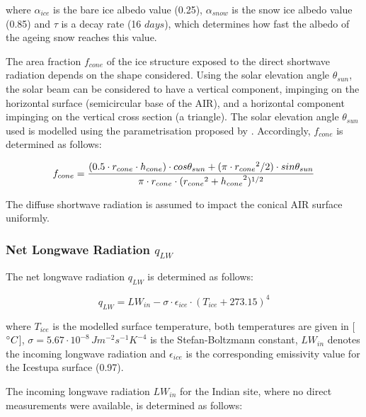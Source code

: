 \documentclass[utf8]{frontiersSCNS} %
\begin{document}
where $\alpha_{ice}$ is the bare ice albedo value (0.25), $\alpha_{snow}$ is the snow ice albedo value (0.85)
and $\tau$ is a decay rate (16 $days$), which determines how fast the albedo of the ageing snow reaches this
value.

The area fraction $f_{cone}$ of the ice structure exposed to the direct shortwave radiation depends on the shape
considered. Using the solar elevation angle $\theta_{sun}$, the solar beam can be considered to have a vertical
component, impinging on the horizontal surface (semicircular base of the AIR), and a horizontal component
impinging on the vertical cross section (a triangle). The solar elevation angle $\theta_{sun}$ used is modelled
using the parametrisation proposed by \cite{Woolf_1968}. Accordingly, $f_{cone}$ is determined as follows:

\begin{equation}
	\begin{split}
		f_{cone}& =\frac{(0.5 \cdot r_{cone} \cdot h_{cone}) \cdot cos \theta_{sun} +(\pi \cdot
			{r_{cone}}^2/2) \cdot sin \theta_{sun} }{\pi \cdot r_{cone} \cdot ({r_{cone}}^2+{h_{cone}}^2)^{1/2}}\\
	\end{split}
	\label{eqn:f_{cone}}
\end{equation}

The diffuse shortwave radiation is assumed to impact the conical AIR surface uniformly.

\subsubsection{Net Longwave Radiation \texorpdfstring{$q_{LW}$}{Lg}}

The net longwave radiation $q_{LW}$ is determined as follows:

\begin{equation}
	q_{LW}= LW_{in}-\sigma \cdot \epsilon_{ice} \cdot {(T_{ice}+ 273.15)}^4
	\label{eqn:LW}
\end{equation}

where $T_{ice}$ is the modelled surface temperature, both temperatures are given in [$\degree C$],
$\sigma=5.67\cdot10^{-8}\,Jm^{-2}s^{-1}K^{-4}$ is the Stefan-Boltzmann constant, $LW_{in}$ denotes the incoming
longwave radiation and $\epsilon_{ice}$ is the corresponding emissivity value for the Icestupa surface (0.97).

The incoming longwave radiation $LW_{in}$ for the Indian site, where no direct measurements were available, is
determined as follows:
\end{document}
